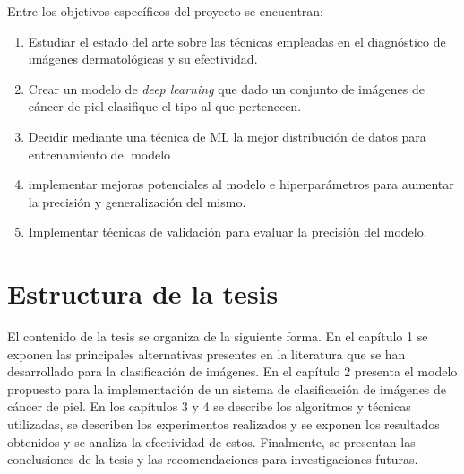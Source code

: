 Entre los objetivos específicos del proyecto se encuentran:

\begin{enumerate}
    \item Estudiar el estado del arte sobre las técnicas empleadas en el diagnóstico de imágenes dermatológicas y su efectividad.
    \item Crear un modelo de \textit{deep learning} que dado un conjunto de imágenes de cáncer de piel clasifique el tipo al que pertenecen.
    \item Decidir mediante una técnica de ML la mejor distribución de datos para entrenamiento del modelo 
    \item implementar mejoras potenciales al modelo e hiperparámetros para aumentar la precisión y generalización del mismo.
    \item Implementar técnicas de validación para evaluar la precisión del modelo.
\end{enumerate}

\section*{Estructura de la tesis}

El contenido de la tesis se organiza de la siguiente forma. En el capítulo 1 se exponen las principales alternativas presentes en la literatura que se han desarrollado para la clasificación de imágenes. En el capítulo 2 presenta el modelo propuesto para la implementación de un sistema de clasificación de imágenes de cáncer de piel. En los capítulos 3 y 4 se describe  los algoritmos y técnicas utilizadas, se describen los experimentos realizados y se exponen los resultados obtenidos y se analiza la efectividad de estos. Finalmente, se presentan las conclusiones de la tesis y las recomendaciones para investigaciones futuras.